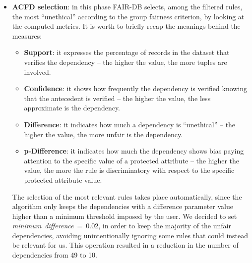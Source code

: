 \begin{itemize}
\item \textbf{ACFD selection}: in this phase FAIR-DB selects, among the filtered rules, the most ``unethical'' according to the group fairness criterion, by looking at the computed metrics. It is worth to briefly recap the meanings behind the measures:
\begin{itemize}
\item \textbf{Support}: it expresses the percentage of records in the dataset that verifies the dependency -- the higher the value, the more tuples are involved.
\item \textbf{Confidence}: it shows how frequently the dependency is verified knowing that the antecedent is verified -- the higher the value, the less approximate is the dependency.
\item \textbf{Difference}: it indicates how much a dependency is ``unethical'' -- the higher the value, the more unfair is the dependency.
\item \textbf{p-Difference}: it indicates how much the dependency shows bias paying attention to the specific value of a protected attribute -- the higher the value, the more the rule is discriminatory with respect to the specific protected attribute value.
\end{itemize}

The selection of the most relevant rules takes place automatically, since the algorithm only keeps the dependencies with a difference parameter value higher than a minimum threshold imposed by the user. We decided to set \textit{minimum~difference}~=~0.02, in order to keep the majority of the unfair dependencies, avoiding unintentionally ignoring some rules that could instead be relevant for us. This operation resulted in a reduction in the number of dependencies from 49 to 10.


\end{itemize}
